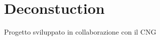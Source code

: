 \section{Deconstuction}
\label{sec:chapter_4_section_2}

Progetto sviluppato in collaborazione con il CNG
